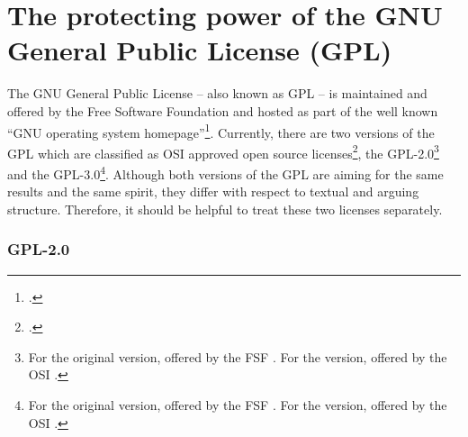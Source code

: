 \section{The protecting power of the GNU General Public License (GPL)}
\label{sec:ProtectingPowerOfGpl}

The GNU General Public License -- also known as GPL -- is maintained and offered
by the Free Software Foundation and hosted as part of the well known
\enquote{GNU operating system homepage}\footcite[cf.][\nopage
wp]{FsfGnuOsLicenses2011a}. Currently, there are two versions of the GPL which
are classified as OSI approved open source licenses\footcite[cf.][\nopage
wp]{OSI2012b}, the GPL-2.0\footnote{For the original version, offered by the FSF
\cite[cf.][\nopage wp]{Gpl20FsfLicense1991a}. For the version, offered by the
OSI \cite[cf.][\nopage wp]{Gpl20OsiLicense1991a}.} and the GPL-3.0\footnote{For
the original version, offered by the FSF \cite[cf.][\nopage
wp]{Gpl30FsfLicense2007a}. For the version, offered by the OSI
\cite[cf.][\nopage wp]{Gpl30OsiLicense2007a}.}. Although both versions of the
GPL are aiming for the same results and the same spirit, they differ with
respect to textual and arguing structure. Therefore, it should be helpful to
treat these two licenses separately.

\subsubsection {GPL-2.0} \label{subsec:ProtectingPowerOfGpl20}

